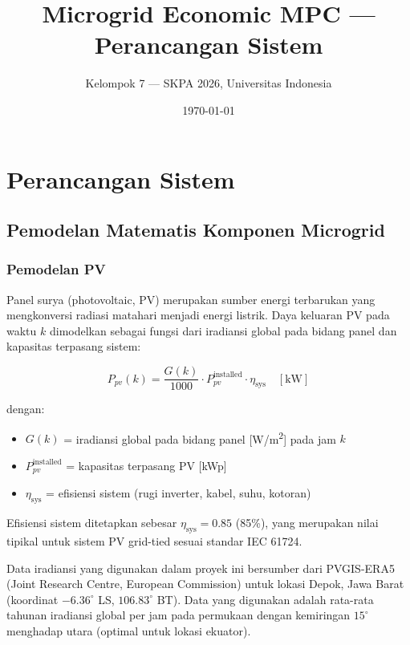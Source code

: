 \documentclass{article}
\title{Microgrid Economic MPC --- Perancangan Sistem}
\author{Kelompok 7 --- SKPA 2026, Universitas Indonesia}
\date{\today}
\begin{document}
\maketitle



\section{Perancangan Sistem}

\subsection{Pemodelan Matematis Komponen Microgrid}

\subsubsection{Pemodelan PV}

Panel surya (photovoltaic, PV) merupakan sumber energi terbarukan yang mengkonversi radiasi matahari menjadi energi listrik. Daya keluaran PV pada waktu $k$ dimodelkan sebagai fungsi dari iradiansi global pada bidang panel dan kapasitas terpasang sistem:

\begin{equation}
P_{pv}(k) = \frac{G(k)}{1000} \cdot P_{pv}^{\text{installed}} \cdot \eta_{\text{sys}} \quad [\text{kW}]
\end{equation}

dengan:
\begin{itemize}
    \item $G(k)$ = iradiansi global pada bidang panel [W/m\textsuperscript{2}] pada jam $k$
    \item $P_{pv}^{\text{installed}}$ = kapasitas terpasang PV [kWp]
    \item $\eta_{\text{sys}}$ = efisiensi sistem (rugi inverter, kabel, suhu, kotoran)
\end{itemize}

Efisiensi sistem ditetapkan sebesar $\eta_{\text{sys}} = 0.85$ (85\%), yang merupakan nilai tipikal untuk sistem PV grid-tied sesuai standar IEC 61724.

Data iradiansi yang digunakan dalam proyek ini bersumber dari PVGIS-ERA5 (Joint Research Centre, European Commission) untuk lokasi Depok, Jawa Barat (koordinat $-6.36^\circ$ LS, $106.83^\circ$ BT). Data yang digunakan adalah rata-rata tahunan iradiansi global per jam pada permukaan dengan kemiringan $15^\circ$ menghadap utara (optimal untuk lokasi ekuator).
\end{document}
